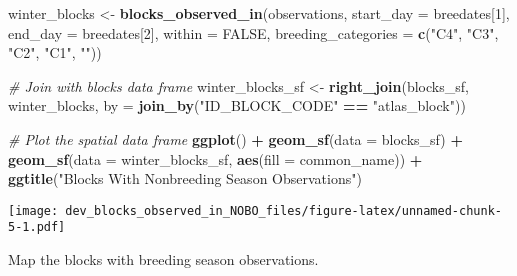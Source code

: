 \documentclass[
]{article}
\newenvironment{Shaded}{\begin{snugshade}}{\end{snugshade}}
\newcommand{\AttributeTok}[1]{\textcolor[rgb]{0.13,0.29,0.53}{#1}}
\newcommand{\CommentTok}[1]{\textcolor[rgb]{0.56,0.35,0.01}{\textit{#1}}}
\newcommand{\ConstantTok}[1]{\textcolor[rgb]{0.56,0.35,0.01}{#1}}
\newcommand{\DecValTok}[1]{\textcolor[rgb]{0.00,0.00,0.81}{#1}}
\newcommand{\FunctionTok}[1]{\textcolor[rgb]{0.13,0.29,0.53}{\textbf{#1}}}
\newcommand{\NormalTok}[1]{#1}
\newcommand{\OtherTok}[1]{\textcolor[rgb]{0.56,0.35,0.01}{#1}}
\newcommand{\SpecialCharTok}[1]{\textcolor[rgb]{0.81,0.36,0.00}{\textbf{#1}}}
\newcommand{\StringTok}[1]{\textcolor[rgb]{0.31,0.60,0.02}{#1}}
\begin{document}
\begin{Shaded}
\begin{Highlighting}[]
\NormalTok{winter\_blocks }\OtherTok{\textless{}{-}} \FunctionTok{blocks\_observed\_in}\NormalTok{(observations, }\AttributeTok{start\_day =}\NormalTok{ breedates[}\DecValTok{1}\NormalTok{], }
                                    \AttributeTok{end\_day =}\NormalTok{ breedates[}\DecValTok{2}\NormalTok{], }
                                    \AttributeTok{within =} \ConstantTok{FALSE}\NormalTok{,}
                                    \AttributeTok{breeding\_categories =} \FunctionTok{c}\NormalTok{(}\StringTok{"C4"}\NormalTok{, }\StringTok{"C3"}\NormalTok{, }\StringTok{"C2"}\NormalTok{, }
                                                            \StringTok{"C1"}\NormalTok{, }\StringTok{""}\NormalTok{))}

\CommentTok{\# Join with blocks data frame}
\NormalTok{winter\_blocks\_sf }\OtherTok{\textless{}{-}} \FunctionTok{right\_join}\NormalTok{(blocks\_sf, winter\_blocks, }
                               \AttributeTok{by =} \FunctionTok{join\_by}\NormalTok{(}\StringTok{"ID\_BLOCK\_CODE"} \SpecialCharTok{==} \StringTok{"atlas\_block"}\NormalTok{))}

\CommentTok{\# Plot the spatial data frame}
\FunctionTok{ggplot}\NormalTok{() }\SpecialCharTok{+}
  \FunctionTok{geom\_sf}\NormalTok{(}\AttributeTok{data =}\NormalTok{ blocks\_sf) }\SpecialCharTok{+}
  \FunctionTok{geom\_sf}\NormalTok{(}\AttributeTok{data =}\NormalTok{ winter\_blocks\_sf, }\FunctionTok{aes}\NormalTok{(}\AttributeTok{fill =}\NormalTok{ common\_name)) }\SpecialCharTok{+}
  \FunctionTok{ggtitle}\NormalTok{(}\StringTok{"Blocks With Nonbreeding Season Observations"}\NormalTok{)}
\end{Highlighting}
\end{Shaded}

\texttt{[image: dev\_blocks\_observed\_in\_NOBO\_files/figure-latex/unnamed-chunk-5-1.pdf]}

Map the blocks with breeding season observations.
\end{document}
